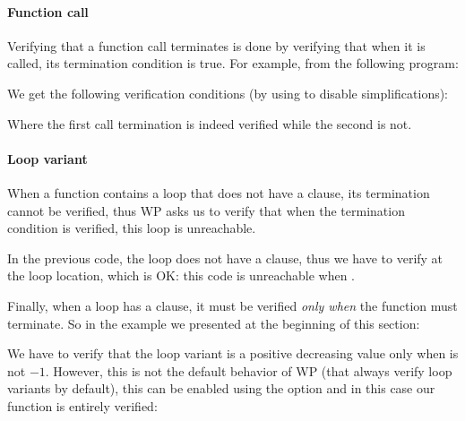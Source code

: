 

\paragraph{Function call}


Verifying that a function call terminates is done by verifying that when it is
called, its termination condition is true. For example, from the following
program:




We get the following verification conditions (by using 
to disable simplifications):






Where the first call termination is indeed verified while the second is not.


\paragraph{Loop variant}


When a function contains a loop that does not have a 
clause, its termination cannot be verified, thus WP asks us to verify that when
the termination condition is verified, this loop is unreachable.




In the previous code, the loop does not have a 
clause, thus we have to verify 
at the loop location, which is OK: this code is unreachable when
.


Finally, when a loop has a  clause, it must be
verified {\em only when} the function must terminate. So in the example
we presented at the beginning of this section:




We have to verify that the loop variant is a positive decreasing value only
when  is not $-1$. However, this is not the default
behavior of WP (that always verify loop variants by default), this can
be enabled using the option  and
in this case our function is entirely verified:




